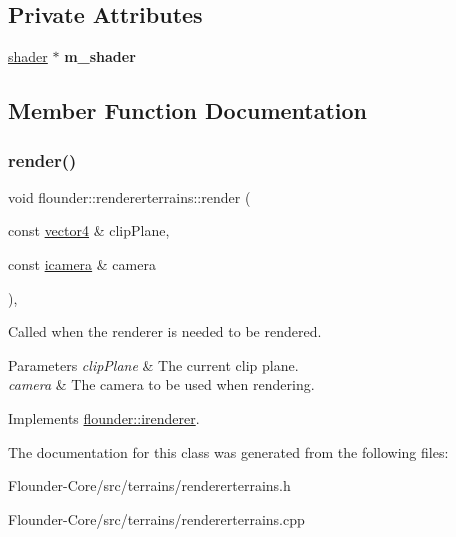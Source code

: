 \subsection*{Private Attributes}
\begin{DoxyCompactItemize}
\item 
\mbox{\label{classflounder_1_1rendererterrains_a6b5b6a1be3c5bd81c17c69b5181c2805}} 
\hyperlink{classflounder_1_1shader}{shader} $\ast$ {\bfseries m\+\_\+shader}
\end{DoxyCompactItemize}


\subsection{Member Function Documentation}
\mbox{\label{classflounder_1_1rendererterrains_a3e8560c23b117b52a369a8f17b2bd39e}} 
\subsubsection{\texorpdfstring{render()}{render()}}
{\footnotesize\ttfamily void flounder\+::rendererterrains\+::render (\begin{DoxyParamCaption}\item[{const \hyperlink{classflounder_1_1vector4}{vector4} \&}]{clip\+Plane,  }\item[{const \hyperlink{classflounder_1_1icamera}{icamera} \&}]{camera }\end{DoxyParamCaption})\hspace{0.3cm}{\ttfamily [override]}, {\ttfamily [virtual]}}



Called when the renderer is needed to be rendered. 


\begin{DoxyParams}{Parameters}
{\em clip\+Plane} & The current clip plane. \\
\hline
{\em camera} & The camera to be used when rendering. \\
\hline
\end{DoxyParams}


Implements \hyperlink{classflounder_1_1irenderer_a3f355dc39e2680bf3f3441d3dfaaa010}{flounder\+::irenderer}.



The documentation for this class was generated from the following files\+:\begin{DoxyCompactItemize}
\item 
Flounder-\/\+Core/src/terrains/rendererterrains.\+h\item 
Flounder-\/\+Core/src/terrains/rendererterrains.\+cpp\end{DoxyCompactItemize}

